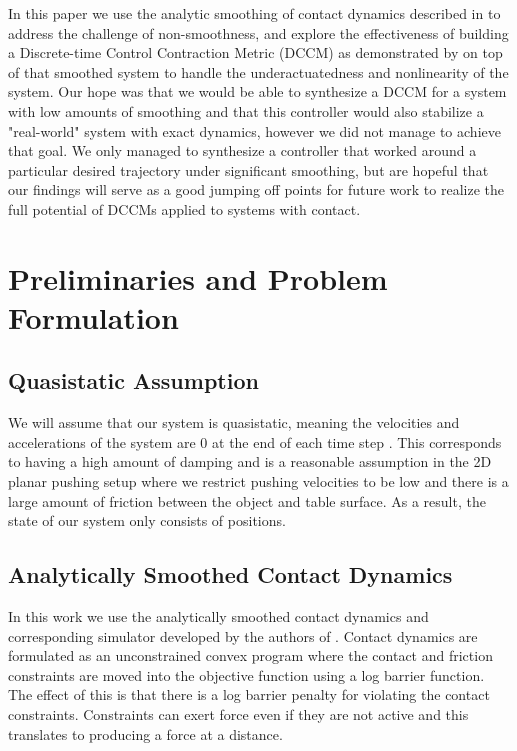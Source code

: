 \documentclass[journal]{IEEEtran}
\begin{document}
In this paper we use the analytic smoothing of contact dynamics described in \autocite{pangGlobalPlanningContactRich2023} to address the challenge of non-smoothness, and explore the effectiveness of building a Discrete-time Control Contraction Metric (DCCM) as demonstrated by \autocite{weiControlContractionMetric2021} on top of that smoothed system to handle the underactuatedness and nonlinearity of the system. Our hope was that we would be able to synthesize a DCCM for a system with low amounts of smoothing and that this controller would also stabilize a "real-world" system with exact dynamics, however we did not manage to achieve that goal. We only managed to synthesize a controller that worked around a particular desired trajectory under significant smoothing, but are hopeful that our findings will serve as a good jumping off points for future work to realize the full potential of DCCMs applied to systems with contact.

\section{Preliminaries and Problem Formulation}
\subsection{Quasistatic Assumption}
We will assume that our system is quasistatic, meaning the velocities and accelerations of the system are 0 at the end of each time step \autocite{pangGlobalPlanningContactRich2023}. This corresponds to having a high amount of damping and is a reasonable assumption in the 2D planar pushing setup where we restrict pushing velocities to be low and there is a large amount of friction between the object and table surface. As a result, the state of our system only consists of positions.

\subsection{Analytically Smoothed Contact Dynamics} \label{sec:smoothing}
In this work we use the analytically smoothed contact dynamics and corresponding simulator developed by the authors of \autocite{pangGlobalPlanningContactRich2023}. Contact dynamics are formulated as an unconstrained convex program where the contact and friction constraints are moved into the objective function using a log barrier function. The effect of this is that there is a log barrier penalty for violating the contact constraints. Constraints can exert force even if they are not active and this translates to producing a force at a distance.
\end{document}
